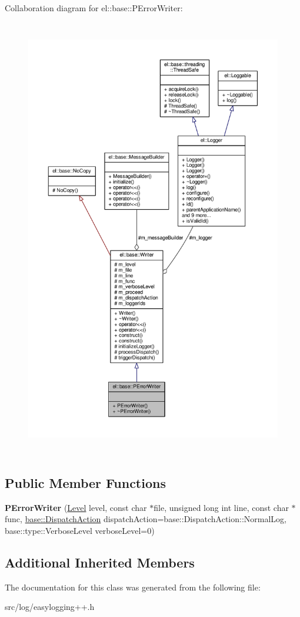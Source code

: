 Collaboration diagram for el\+:\+:base\+:\+:P\+Error\+Writer\+:
\nopagebreak
\begin{figure}[H]
\begin{center}
\leavevmode
\includegraphics[height=550pt]{d3/d38/classel_1_1base_1_1PErrorWriter__coll__graph}
\end{center}
\end{figure}
\subsection*{Public Member Functions}
\begin{DoxyCompactItemize}
\item 
{\bfseries P\+Error\+Writer} (\hyperlink{namespaceel_ab0ac6091262344c52dd2d3ad099e8e36}{Level} level, const char $\ast$file, unsigned long int line, const char $\ast$func, \hyperlink{namespaceel_1_1base_a3aa2563d38e47388ba242a1694fc2839}{base\+::\+Dispatch\+Action} dispatch\+Action=base\+::\+Dispatch\+Action\+::\+Normal\+Log, base\+::type\+::\+Verbose\+Level verbose\+Level=0)\hypertarget{classel_1_1base_1_1PErrorWriter_a60d1ff92d16e3927e2c4b5bb77d34092}{}\label{classel_1_1base_1_1PErrorWriter_a60d1ff92d16e3927e2c4b5bb77d34092}

\end{DoxyCompactItemize}
\subsection*{Additional Inherited Members}


The documentation for this class was generated from the following file\+:\begin{DoxyCompactItemize}
\item 
src/log/easylogging++.\+h\end{DoxyCompactItemize}
